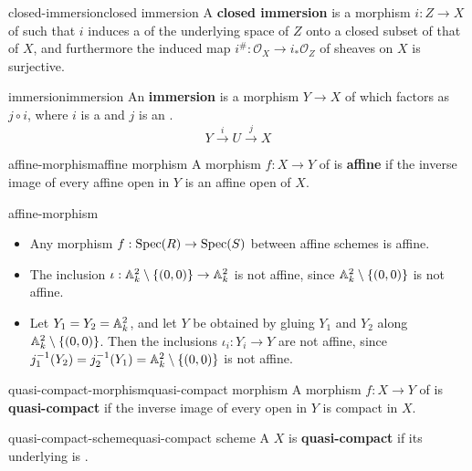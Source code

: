 \begin{topic}{closed-immersion}{closed immersion}
    A \textbf{closed immersion} is a morphism $i : Z \to X$ of  such that $i$ induces a  of the underlying space of $Z$ onto a closed subset of that of $X$, and furthermore the induced map $i^\# : \mathcal{O}_X \to i_*\mathcal{O}_Z$ of sheaves on $X$ is surjective.
\end{topic}

\begin{topic}{immersion}{immersion}
    An \textbf{immersion} is a morphism $Y \to X$ of  which factors as $j \circ i$, where $i$ is a  and $j$ is an .
    \[ Y \xrightarrow{i} U \xrightarrow{j} X \]
\end{topic}

\begin{topic}{affine-morphism}{affine morphism}
    A morphism $f : X \to Y$ of  is \textbf{affine} if the inverse image of every affine open in $Y$ is an affine open of $X$. 
\end{topic}

\begin{example}{affine-morphism}
    \begin{itemize}
        \item Any morphism $f : \Spec(R) \to \Spec(S)$ between affine schemes is affine.
        \item The inclusion $\iota : \AA^2_k \setminus \{ (0, 0) \} \to \AA^2_k$ is not affine, since $\AA^2_k \setminus \{ (0, 0) \}$ is not affine.
        \item Let $Y_1 = Y_2 = \AA^2_k$, and let $Y$ be obtained by gluing $Y_1$ and $Y_2$ along $\AA^2_k \setminus \{ (0, 0) \}$. Then the inclusions $\iota_i : Y_i \to Y$ are not affine, since $j_1^{-1}(Y_2) = j_2^{-1}(Y_1) = \AA^2_k \setminus \{ (0, 0) \}$ is not affine.
    \end{itemize}
\end{example}

\begin{topic}{quasi-compact-morphism}{quasi-compact morphism}
    A morphism $f : X \to Y$ of  is \textbf{quasi-compact} if the inverse image of every  open in $Y$ is compact in $X$.
\end{topic}

\begin{topic}{quasi-compact-scheme}{quasi-compact scheme}
    A  $X$ is \textbf{quasi-compact} if its underlying  is .
\end{topic}

